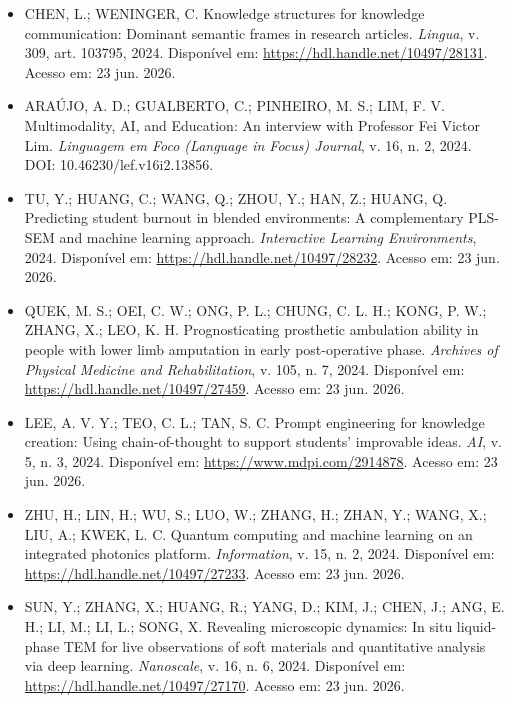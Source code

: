 \documentclass[english]{textolivre}
\begin{document}
\begin{itemize}
\item[] CHEN, L.; WENINGER, C. Knowledge structures for knowledge communication: Dominant semantic frames in research articles. \textit{Lingua}, v. 309, art. 103795, 2024. Disponível em: \url{https://hdl.handle.net/10497/28131}. Acesso em: 23 jun. 2026.

\item[] ARAÚJO, A. D.; GUALBERTO, C.; PINHEIRO, M. S.; LIM, F. V. Multimodality, AI, and Education: An interview with Professor Fei Victor Lim. \textit{Linguagem em Foco (Language in Focus) Journal}, v. 16, n. 2, 2024. DOI: 10.46230/lef.v16i2.13856.

\item[] TU, Y.; HUANG, C.; WANG, Q.; ZHOU, Y.; HAN, Z.; HUANG, Q. Predicting student burnout in blended environments: A complementary PLS-SEM and machine learning approach. \textit{Interactive Learning Environments}, 2024. Disponível em: \url{https://hdl.handle.net/10497/28232}. Acesso em: 23 jun. 2026.

\item[] QUEK, M. S.; OEI, C. W.; ONG, P. L.; CHUNG, C. L. H.; KONG, P. W.; ZHANG, X.; LEO, K. H. Prognosticating prosthetic ambulation ability in people with lower limb amputation in early post-operative phase. \textit{Archives of Physical Medicine and Rehabilitation}, v. 105, n. 7, 2024. Disponível em: \url{https://hdl.handle.net/10497/27459}. Acesso em: 23 jun. 2026.

\item[] LEE, A. V. Y.; TEO, C. L.; TAN, S. C. Prompt engineering for knowledge creation: Using chain-of-thought to support students’ improvable ideas. \textit{AI}, v. 5, n. 3, 2024. Disponível em: \url{https://www.mdpi.com/2914878}. Acesso em: 23 jun. 2026.

\item[] ZHU, H.; LIN, H.; WU, S.; LUO, W.; ZHANG, H.; ZHAN, Y.; WANG, X.; LIU, A.; KWEK, L. C. Quantum computing and machine learning on an integrated photonics platform. \textit{Information}, v. 15, n. 2, 2024. Disponível em: \url{https://hdl.handle.net/10497/27233}. Acesso em: 23 jun. 2026.

\item[] SUN, Y.; ZHANG, X.; HUANG, R.; YANG, D.; KIM, J.; CHEN, J.; ANG, E. H.; LI, M.; LI, L.; SONG, X. Revealing microscopic dynamics: In situ liquid-phase TEM for live observations of soft materials and quantitative analysis via deep learning. \textit{Nanoscale}, v. 16, n. 6, 2024. Disponível em: \url{https://hdl.handle.net/10497/27170}. Acesso em: 23 jun. 2026.


\end{itemize}
\end{document}
